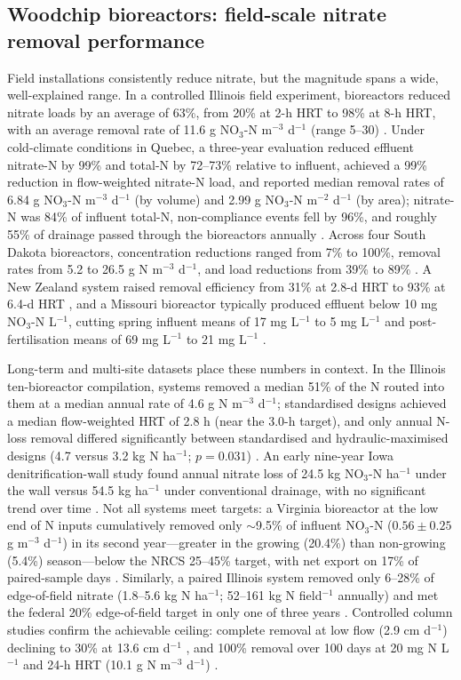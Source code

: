 \subsection{Woodchip bioreactors: field-scale nitrate removal performance}

Field installations consistently reduce nitrate, but the magnitude spans a wide, well-explained range. In a controlled Illinois field experiment, bioreactors reduced nitrate loads by an average of 63\%, from 20\% at 2-h HRT to 98\% at 8-h HRT, with an average removal rate of 11.6 g NO$_3$-N m$^{-3}$ d$^{-1}$ (range 5--30) \parencite{Bell2015}. Under cold-climate conditions in Quebec, a three-year evaluation reduced effluent nitrate-N by 99\% and total-N by 72--73\% relative to influent, achieved a 99\% reduction in flow-weighted nitrate-N load, and reported median removal rates of 6.84 g NO$_3$-N m$^{-3}$ d$^{-1}$ (by volume) and 2.99 g NO$_3$-N m$^{-2}$ d$^{-1}$ (by area); nitrate-N was 84\% of influent total-N, non-compliance events fell by 96\%, and roughly 55\% of drainage passed through the bioreactors annually \parencite{Husk2017}. Across four South Dakota bioreactors, concentration reductions ranged from 7\% to 100\%, removal rates from 5.2 to 26.5 g N m$^{-3}$ d$^{-1}$, and load reductions from 39\% to 89\% \parencite{Thapa2023}. A New Zealand system raised removal efficiency from 31\% at 2.8-d HRT to 93\% at 6.4-d HRT \parencite{Rivas2020}, and a Missouri bioreactor typically produced effluent below 10 mg NO$_3$-N L$^{-1}$, cutting spring influent means of 17 mg L$^{-1}$ to 5 mg L$^{-1}$ and post-fertilisation means of 69 mg L$^{-1}$ to 21 mg L$^{-1}$ \parencite{Aide2016}.

Long-term and multi-site datasets place these numbers in context. In the Illinois ten-bioreactor compilation, systems removed a median 51\% of the N routed into them at a median annual rate of 4.6 g N m$^{-3}$ d$^{-1}$; standardised designs achieved a median flow-weighted HRT of 2.8 h (near the 3.0-h target), and only annual N-loss removal differed significantly between standardised and hydraulic-maximised designs (4.7 versus 3.2 kg N ha$^{-1}$; $p=0.031$) \parencite{Christianson2026}. An early nine-year Iowa denitrification-wall study found annual nitrate loss of 24.5 kg NO$_3$-N ha$^{-1}$ under the wall versus 54.5 kg ha$^{-1}$ under conventional drainage, with no significant trend over time \parencite{Moorman2010}. Not all systems meet targets: a Virginia bioreactor at the low end of N inputs cumulatively removed only $\sim$9.5\% of influent NO$_3$-N ($0.56 \pm 0.25$ g m$^{-3}$ d$^{-1}$) in its second year---greater in the growing (20.4\%) than non-growing (5.4\%) season---below the NRCS 25--45\% target, with net export on 17\% of paired-sample days \parencite{Bock2018}. Similarly, a paired Illinois system removed only 6--28\% of edge-of-field nitrate (1.8--5.6 kg N ha$^{-1}$; 52--161 kg N field$^{-1}$ annually) and met the federal 20\% edge-of-field target in only one of three years \parencite{Maxwell2022}. Controlled column studies confirm the achievable ceiling: complete removal at low flow (2.9 cm d$^{-1}$) declining to 30\% at 13.6 cm d$^{-1}$ \parencite{Greenan2009}, and 100\% removal over 100 days at 20 mg N L$^{-1}$ and 24-h HRT (10.1 g N m$^{-3}$ d$^{-1}$) \parencite{Hua2016}.

